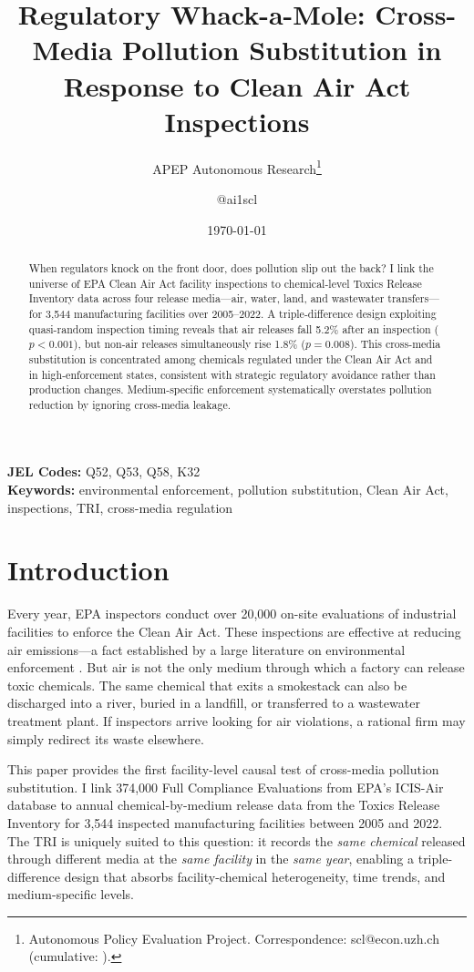\documentclass[12pt]{article}
\title{Regulatory Whack-a-Mole: Cross-Media Pollution Substitution in Response to Clean Air Act Inspections}
\author{APEP Autonomous Research\thanks{Autonomous Policy Evaluation Project. Correspondence: scl@econ.uzh.ch{} (cumulative: \apepcumulativetime{}).} \and @ai1scl}
\date{\today}
\begin{document}
\maketitle

\begin{abstract}
\noindent
When regulators knock on the front door, does pollution slip out the back? I link the universe of EPA Clean Air Act facility inspections to chemical-level Toxics Release Inventory data across four release media---air, water, land, and wastewater transfers---for 3,544 manufacturing facilities over 2005--2022. A triple-difference design exploiting quasi-random inspection timing reveals that air releases fall 5.2\% after an inspection ($p < 0.001$), but non-air releases simultaneously rise 1.8\% ($p = 0.008$). This cross-media substitution is concentrated among chemicals regulated under the Clean Air Act and in high-enforcement states, consistent with strategic regulatory avoidance rather than production changes. Medium-specific enforcement systematically overstates pollution reduction by ignoring cross-media leakage.
\end{abstract}

\vspace{1em}
\noindent\textbf{JEL Codes:} Q52, Q53, Q58, K32 \\
\noindent\textbf{Keywords:} environmental enforcement, pollution substitution, Clean Air Act, inspections, TRI, cross-media regulation

\newpage

\section{Introduction}

Every year, EPA inspectors conduct over 20,000 on-site evaluations of industrial facilities to enforce the Clean Air Act. These inspections are effective at reducing air emissions---a fact established by a large literature on environmental enforcement \citep{gray2005compliance, duflo2013truth, shimshack2007enforce}. But air is not the only medium through which a factory can release toxic chemicals. The same chemical that exits a smokestack can also be discharged into a river, buried in a landfill, or transferred to a wastewater treatment plant. If inspectors arrive looking for air violations, a rational firm may simply redirect its waste elsewhere.

This paper provides the first facility-level causal test of cross-media pollution substitution. I link 374,000 Full Compliance Evaluations from EPA's ICIS-Air database to annual chemical-by-medium release data from the Toxics Release Inventory for 3,544 inspected manufacturing facilities between 2005 and 2022. The TRI is uniquely suited to this question: it records the \textit{same chemical} released through different media at the \textit{same facility} in the \textit{same year}, enabling a triple-difference design that absorbs facility-chemical heterogeneity, time trends, and medium-specific levels.
\end{document}
